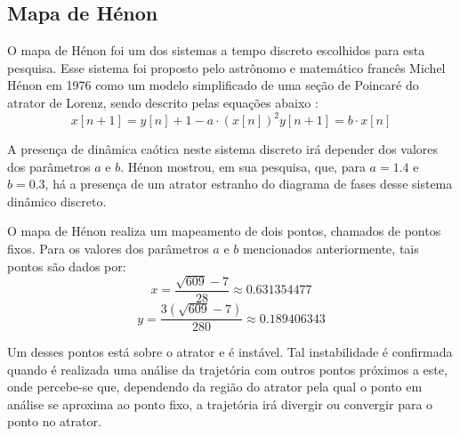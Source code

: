 \documentclass[a4paper, 12pt]{article}
\begin{document}
\subsection{Mapa de Hénon}

O mapa de Hénon foi um dos sistemas a tempo discreto escolhidos para esta pesquisa. Esse sistema foi proposto pelo astrônomo e matemático francês  Michel Hénon em 1976 como um modelo simplificado de uma seção de Poincaré do atrator de Lorenz, sendo descrito pelas equações abaixo \cite{henon1976two}:
\begin{subequations}
\begin{equation}
x[n+1] = y[n] + 1 - a\cdot (x[n])^2
\end{equation}
\begin{equation}
y[n+1] = b \cdot x[n]
\end{equation}
\end{subequations}

A presença de dinâmica caótica neste sistema discreto irá depender dos valores dos parâmetros $a$ e $b$. Hénon mostrou, em sua pesquisa, que, para $a = 1.4$ e $b = 0.3$, há a presença de um atrator estranho do diagrama de fases desse sistema dinâmico discreto. 

O mapa de Hénon realiza um mapeamento de dois pontos, chamados de pontos fixos. Para os valores dos parâmetros $a$ e $b$ mencionados anteriormente, tais pontos são dados por:
$$x = \frac{\sqrt{609}-7}{28} \approx 0.631354477$$
$$y = \frac{3(\sqrt{609}-7)}{280} \approx 0.189406343$$

Um desses pontos está sobre o atrator e é instável. Tal instabilidade é confirmada quando é realizada uma análise da trajetória com outros pontos próximos a este, onde percebe-se que, dependendo da região do atrator pela qual o ponto em análise se aproxima ao ponto fixo, a trajetória irá divergir ou convergir para o ponto no atrator. 
\end{document}
